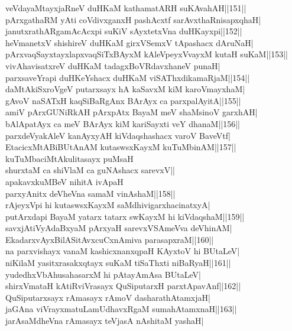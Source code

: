 \documentclass{article}
\begin{document}
veVdayaMtayxjaRneV duHKaM kathamatARH suKAvahAH||151||\\
pArxgathaRM yAti coVdivxganxH pashAcxtf sarAvxthaRnisapxqhaH|\\
janutxrathARgamAcAcxpi suKiV sAyxtetxVna duHKayxpi||152||\\
heVmanetxV shishireV duHKaM girxVSemxV tApashacx dAruNaH|\\
pArxvaqSayxtayxlapxvaqSiTxBAyxM kAleVpeyxVvayxM kutaH suKaM||153||\\
vivAhavisatxreV duHKaM tadagxBoVRdavxhaneV punaH|\\
parxsaveYrapi duHKeYshacx duHKaM viSAThxdikamaRjaM||154||\\
daMtAkiSxroVgeV putarxsayx hA kaSavxM kiM karoVmayxhaM|\\
gAvoV naSATxH kaqSiBaRgAnx BArAyx ca parxpalAyitA||155||\\
amiV pArxGUNiRkAH pArxpAtx BayaM meV shaMsinoV garxhAH|\\
bAlApatAyx ca meV BArAyx kiM kariSayxti veY dhanaM||156||\\
parxdeVyakAleV kanAyxyAH kiVdaqshashacx varoV BaveVtf|\\
EtacicxMtABiBUtAnAM kutaswsxKayxM kuTuMbinAM||157||\\
kuTuMbaciMtAkulitasayx puMsaH\\
shurxtaM ca shiVlaM ca guNAshacx sarevxV||\\
apakavxkuMBeV nihitA ivApaH\\
parxyAnitx deVheVna samaM vinAshaM||158||\\
rAjeyxVpi hi kutaswsxKayxM saMdhivigarxhacinatxyA|\\
putArxdapi BayaM yatarx tatarx swKayxM hi kiVdaqshaM||159||\\
savxjAtiVyAdaBxyaM pArxyaH sarevxVSAmeVva deVhinAM|\\
EkadarxvAyxBilASitAvxcuCxnAmiva parasapxraM||160||\\
na parxvishayx vanaM kashicxnanxqpaH KAyxtoV hi BUtaLeV|\\
niKilaM yasitxrasakxqtayx suKaM tiSaThxti niBaRyaH||161||\\
yudedhxVbAhusahasarxM hi pAtayAmAsa BUtaLeV|\\
shirxVmataH kAtiRviVrasayx QuSiputarxH parxtApavAnf||162||\\
QuSiputarxsayx rAmasayx rAmoV dasharathAtamxjaH|\\
jaGAna viVrayxmatuLamUdhavxRgaM sumahAtamxnaH||163||\\
jarAsaMdheVna rAmasayx teVjasA nAshitaM yashaH|\\
\end{document}
